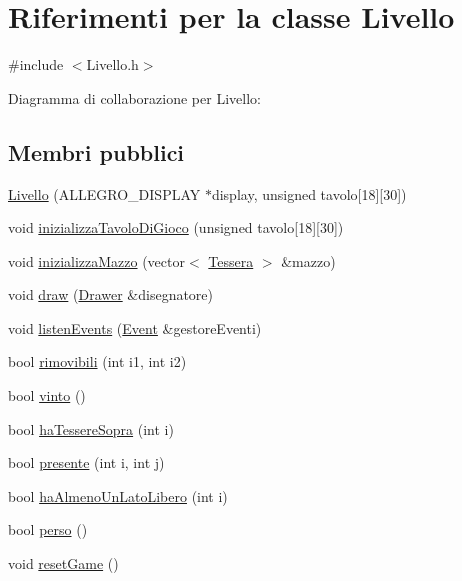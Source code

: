 \hypertarget{class_livello}{}\section{Riferimenti per la classe Livello}
\label{class_livello}


{\ttfamily \#include $<$Livello.\+h$>$}



Diagramma di collaborazione per Livello\+:
\subsection*{Membri pubblici}
\begin{DoxyCompactItemize}
\item 
\hyperlink{class_livello_a7618f4bfd6008dbcbf3fa92fb84767e9}{Livello} (A\+L\+L\+E\+G\+R\+O\+\_\+\+D\+I\+S\+P\+L\+AY $\ast$display, unsigned tavolo\mbox{[}18\mbox{]}\mbox{[}30\mbox{]})
\item 
void \hyperlink{class_livello_aa3021f607bb87dd293cabbac08b97475}{inizializza\+Tavolo\+Di\+Gioco} (unsigned tavolo\mbox{[}18\mbox{]}\mbox{[}30\mbox{]})
\item 
void \hyperlink{class_livello_aff2cb62068d75305993ecf99d5d0d2d5}{inizializza\+Mazzo} (vector$<$ \hyperlink{class_tessera}{Tessera} $>$ \&mazzo)
\item 
void \hyperlink{class_livello_ace88d8069241a9879fe2ebbc9cd30cd5}{draw} (\hyperlink{class_drawer}{Drawer} \&disegnatore)
\item 
void \hyperlink{class_livello_a10eeb00ce588d7ef1e61450cf6f48ae5}{listen\+Events} (\hyperlink{class_event}{Event} \&gestore\+Eventi)
\item 
bool \hyperlink{class_livello_a8e2cce4a55babb0d896e9e959363f6b0}{rimovibili} (int i1, int i2)
\item 
bool \hyperlink{class_livello_a160aa68abbc6445be4bbced74807e3a1}{vinto} ()
\item 
bool \hyperlink{class_livello_a330c46c81139158c4a90f491b7d15151}{ha\+Tessere\+Sopra} (int i)
\item 
bool \hyperlink{class_livello_afe5db8bd89c50b5a61f5dd2c91752e74}{presente} (int i, int j)
\item 
bool \hyperlink{class_livello_aa7fccdc395e08eb3c1b833347c296bbe}{ha\+Almeno\+Un\+Lato\+Libero} (int i)
\item 
bool \hyperlink{class_livello_aedb65253d415e1c5a184c173237a089f}{perso} ()
\item 
void \hyperlink{class_livello_a764dfd1eafd8e239aded749833068b21}{reset\+Game} ()
\end{DoxyCompactItemize}


